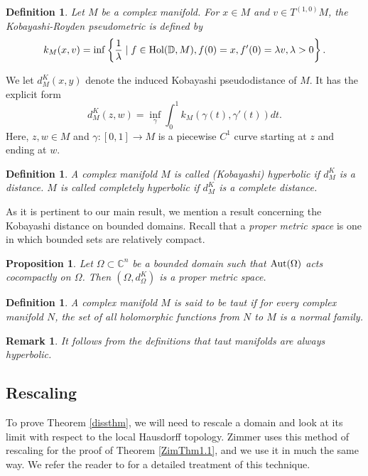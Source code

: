\documentclass[12pt]{article}
\newcommand{\C}{\mathbb{C}}
\newcommand{\Hol}{\textup{Hol}}
\newcommand{\Aut}{\textup{Aut}}
\newtheorem{proposition}[lemma]{Proposition}
\newtheorem{defnition}[lemma]{Definition}
\newtheorem{remrk}[lemma]{Remark}
\newenvironment{definition}{\begin{defnition} \em}{\end{defnition}}
\newenvironment{remark}{\begin{remrk} \em}{\end{remrk}}
\begin{document}
\begin{definition}
\label{kobayashimetric}
Let $M$ be a complex manifold. For $x\in M$ and $v\in T^{(1,0)}M$, the \textit{Kobayashi-Royden pseudometric} is defined by
$$k_{M}(x,v)=\inf\left\{\frac{1}{\lambda}\mid f\in\Hol(\mathbb{D},M),f(0)=x, f'(0)=\lambda v,\lambda>0\right\}.$$
\end{definition}

We let $d_{M}^K(x,y)$ denote the induced Kobayashi pseudodistance of $M$. It has the explicit form
$$d_{M}^K(z,w)=\inf_{\gamma}\int_0^1k_{M}(\gamma(t),\gamma'(t))dt.$$
Here, $z,w\in M$ and $\gamma:[0,1]\to M$ is a piecewise $C^1$ curve starting at $z$ and ending at $w$.

\begin{definition}
\label{hyperbolicmanifolddef}
A complex manifold $M$ is called \textit{(Kobayashi) hyperbolic} if $d_M^K$ is a distance. $M$ is called \textit{completely hyperbolic} if $d_M^K$ is a complete distance.
\end{definition}

As it is pertinent to our main result, we mention a result concerning the Kobayashi distance on bounded domains. Recall that a \textit{proper metric space} is one in which bounded sets are relatively compact.

\begin{proposition}
\label{ZimProp3.1}
Let $\Omega\subset\C^n$ be a bounded domain such that $\Aut(\Omega)$ acts cocompactly on $\Omega$. Then $(\Omega,d^K_{\Omega})$ is a proper metric space.
\end{proposition}

\begin{definition}
\label{TautDef} 
    A complex manifold $M$ is said to be \textit{taut} if for every complex manifold $N$, the set of all holomorphic functions from $N$ to $M$ is a normal family.
\end{definition}

\begin{remark}
\label{TautisHyperbolicRmk}
    It follows from the definitions that taut manifolds are always hyperbolic.
\end{remark}

\subsection{Rescaling}

To prove Theorem \ref{dissthm}, we will need to rescale a domain and look at its limit with respect to the local Hausdorff topology. Zimmer \cite{Zimmer} uses this method of rescaling for the proof of Theorem \ref{ZimThm1.1}, and we use it in much the same way. We refer the reader to \cite{Frankel89} for a detailed treatment of this technique.
\end{document}

